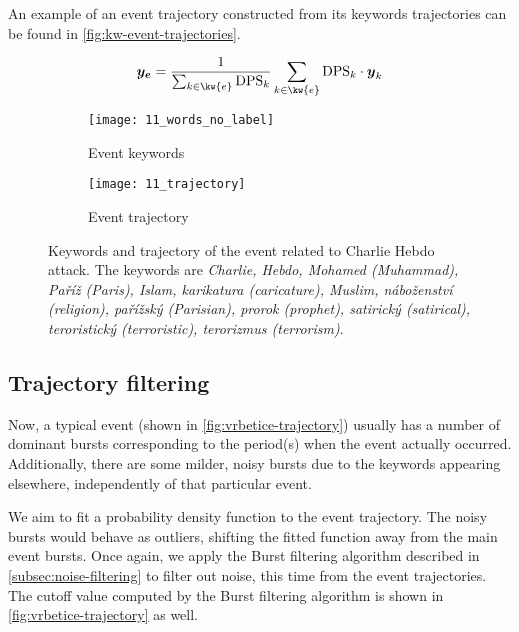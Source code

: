An example of an event trajectory constructed from its keywords trajectories can be found in \autoref{fig:kw-event-trajectories}.

\begin{equation}
	\vect{\traj_{e}} = \frac{1}{\sum_{k \in \kw{e}}{\text{DPS}_{k}}} \sum_{k \in \kw{e}}{\text{DPS}_{k} \cdot \vect{\traj}_{k}}
\end{equation}


\begin{figure}
\centering
\begin{subfigure}{.5\textwidth}
  \centering
  \texttt{[image: 11\_words\_no\_label]}  %
  \caption{Event keywords}
  \label{fig:hebdo-words}
\end{subfigure}%
\begin{subfigure}{.5\textwidth}
  \centering
  \texttt{[image: 11\_trajectory]}  %
  \caption{Event trajectory}
  \label{fig:hebdo-trajectory}
\end{subfigure}
\caption{Keywords and trajectory of the event related to Charlie Hebdo attack. The keywords are \textit{Charlie, Hebdo, Mohamed (Muhammad), Paříž (Paris), Islam, karikatura (caricature), Muslim, náboženství (religion), pařížský (Parisian), prorok (prophet), satirický (satirical), teroristický (terroristic), terorizmus (terrorism)}.}
\label{fig:kw-event-trajectories}
\end{figure}


\subsection{Trajectory filtering}

Now, a typical event (shown in \autoref{fig:vrbetice-trajectory}) usually has a number of dominant bursts corresponding to the period(s) when the event actually occurred. Additionally, there are some milder, noisy bursts due to the keywords appearing elsewhere, independently of that particular event.

We aim to fit a probability density function to the event trajectory. The noisy bursts would behave as outliers, shifting the fitted function away from the main event bursts. Once again, we apply the Burst filtering algorithm described in \autoref{subsec:noise-filtering} to filter out noise, this time from the event trajectories. The cutoff value computed by the Burst filtering algorithm is shown in \autoref{fig:vrbetice-trajectory} as well.


